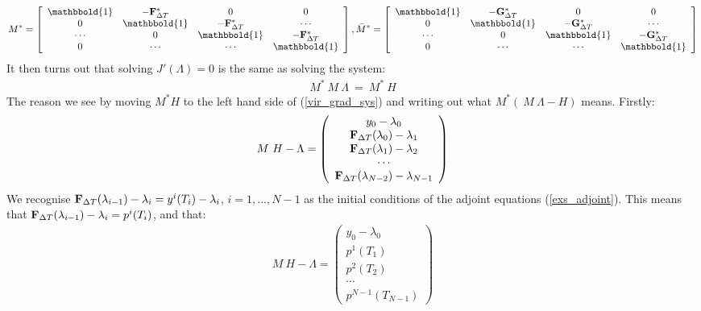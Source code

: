 \begin{align*}
M^*= \left[ \begin{array}{cccc}
   \mathbbold{1} & -\bold{F}_{\Delta T}^* & 0 & 0 \\  
   0 & \mathbbold{1} & -\bold{F}_{\Delta T}^* & \cdots \\ 
   \cdots &0 &  \mathbbold{1} & -\bold{F}_{\Delta T}^* \\
   0 &\cdots &\cdots &  \mathbbold{1}  \\
   \end{array}  \right],
\bar M^*= \left[ \begin{array}{cccc}
   \mathbbold{1} & -\bold{G}_{\Delta T}^* & 0 & 0 \\  
   0 & \mathbbold{1} & -\bold{G}_{\Delta T}^* & \cdots \\ 
   \cdots &0 &  \mathbbold{1} & -\bold{G}_{\Delta T}^* \\
   0 &\cdots &\cdots &  \mathbbold{1}  \\
   \end{array}  \right]
\end{align*}
It then turns out that solving $\hat{J}'(\Lambda)=0$ is the same as solving the system:
\begin{align}
M^* \ M \ \Lambda \ = \ M^* \ H \label{vir_grad_sys}
\end{align}
The reason we see by moving $M^*H$ to the left hand side of (\ref{vir_grad_sys}) and writing out what $M^*( \ M \ \Lambda-H)$ means. Firstly:
\begin{align}
M \ H-\Lambda  = \left( \begin{array}{c}
	y_0-\lambda_0  \\
	 \bold{F}_{\Delta T}(\lambda_0)-\lambda_1 \\
	 \bold{F}_{\Delta T}(\lambda_1)-\lambda_2  \\
	\cdots \\
	\bold{F}_{\Delta T}(\lambda_{N-2})-\lambda_{N-1} 
	\end{array} \right)
\end{align}
We recognise $\bold{F}_{\Delta T}(\lambda_{i-1})-\lambda_i=y^i(T_i) -\lambda_i$, $i=1,...,N-1$ as the initial conditions of the adjoint equations (\ref{exs_adjoint}). This means that $\bold{F}_{\Delta T}(\lambda_{i-1})-\lambda_i=p^i(T_i)$, and that: 
\begin{align}
M \ H-\Lambda  = \left( \begin{array}{c}
	y_0-\lambda_0  \\
	 p^1(T_1) \\
	 p^2( T_2) \\
	\cdots \\
	p^{N-1}(T_{N-1}) 
	\end{array} \right)
\end{align}
